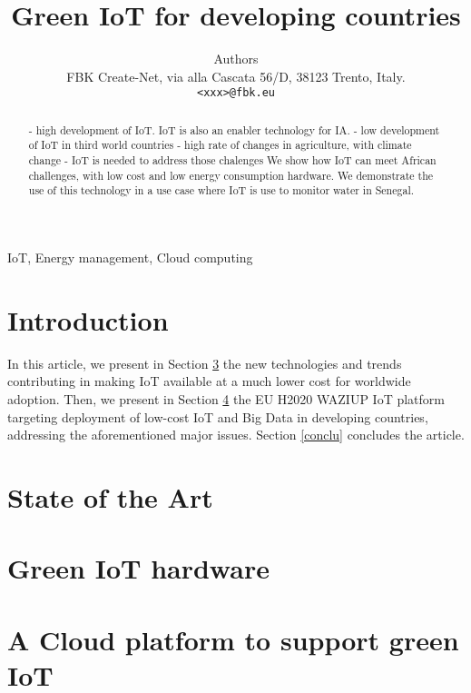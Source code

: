 \documentclass[10pt, conference, compsocconf]{IEEEtran}
\newcommand {\0} {\mathbf 0}
\newcommand {\1} {\mathbf 1}
\begin{document}
\title{Green IoT for developing countries}


\author{
Authors\\
FBK Create-Net, via alla Cascata 56/D, 38123 Trento, Italy.\\
\texttt{<xxx>@fbk.eu}
}

\maketitle

\begin{abstract}
- high development of IoT. IoT is also an enabler technology for IA.
- low development of IoT in third world countries
- high rate of changes in agriculture, with climate change
- IoT is needed to address those chalenges
We show how IoT can meet African challenges, with low cost and low energy consumption hardware.
We demonstrate the use of this technology in a use case where IoT is use to monitor water in Senegal.

\end{abstract}

\begin{IEEEkeywords}
IoT, Energy management, Cloud computing 
\end{IEEEkeywords}

\section{Introduction}
\label{intro}

In this article, we present in Section \ref{iot} the new technologies and trends contributing in making IoT available at a much lower cost for worldwide adoption.
Then, we present in Section \ref{platform} the EU H2020 WAZIUP IoT platform targeting deployment of low-cost IoT and Big Data in developing countries, addressing the aforementioned major issues.
Section \ref{conclu} concludes the article.

\section{State of the Art}
\label{sota}

\section{Green IoT hardware}
\label{iot}


\section{A Cloud platform to support green IoT}
\label{platform}
\end{document}
